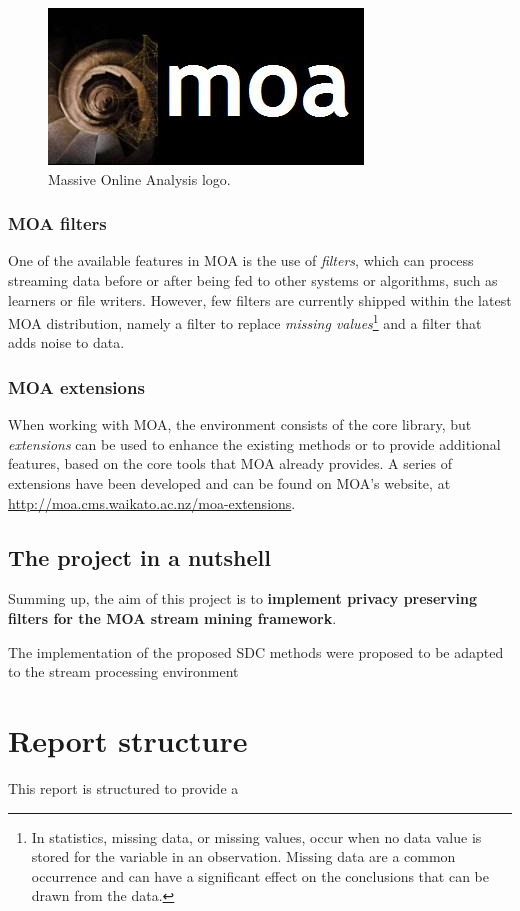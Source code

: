 \begin{figure}[h]
	\centering
	\includegraphics[width=0.4\linewidth]{figures/moa-logo.jpg}
	\caption{Massive Online Analysis logo.}
	\label{fig:moa-logo}
\end{figure}

\subsubsection{MOA filters}

One of the available features in MOA is the use of \textit{filters}, which can process
streaming data before or after being fed to other systems or algorithms, such as learners
or file writers. However, few filters are currently shipped within the latest MOA distribution,
namely a filter to replace \textit{missing values}\footnote{In statistics, missing data, or missing values,
occur when no data value is stored for the variable in an observation. Missing data are a
common occurrence and can have a significant effect on the conclusions that can be drawn
from the data.} and a filter that adds noise to data.

\subsubsection{MOA extensions}

When working with MOA, the environment consists of the core library, but \textit{extensions}
can be used to enhance the existing methods or to provide additional features, based on
the core tools that MOA already provides. A series of extensions have been developed and can
be found on MOA's website, at \url{http://moa.cms.waikato.ac.nz/moa-extensions}.

\subsection{The project in a nutshell}
\label{Introduction::moa-ppsm::ProjectNutshell}

Summing up, the aim of this project is to \textbf{implement privacy preserving filters
for the MOA stream mining framework}.

The implementation of the proposed SDC methods were proposed to be adapted to the stream processing environment

\section{Report structure}
\label{Introduction::Structure}

This report is structured to provide a
